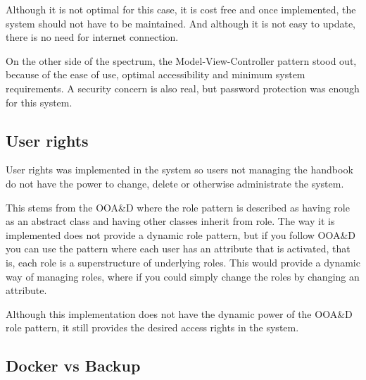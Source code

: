 Although it is not optimal for this case, it is cost free and once implemented, the system should not have to be maintained. And although it is not easy to update, there is no need for internet connection.

On the other side of the spectrum, the Model-View-Controller pattern stood out, because of the ease of use, optimal accessibility and minimum system requirements. A security concern is also real, but password protection was enough for this system.

\subsection{User rights}

User rights was implemented in the system so users not managing the handbook do not have the power to change, delete or otherwise administrate the system.

This stems from the OOA\&D where the role pattern is described as having role as an abstract class and having other classes inherit from role. The way it is implemented does not provide a dynamic role pattern, but if you follow OOA\&D you can use the pattern where each user has an attribute that is activated, that is, each role is a superstructure of underlying roles. This would provide a dynamic way of managing roles, where if you could simply change the roles by changing an attribute. 

Although this implementation does not have the dynamic power of the OOA\&D role pattern, it still provides the desired access rights in the system. 

\subsection{Docker vs Backup}
